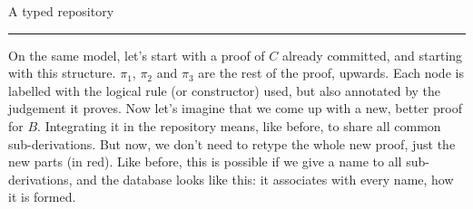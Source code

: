 \documentclass[ignorenonframetext,red]{beamer}
\begin{document}
\begin{frame}{A typed repository}
\end{frame}
\hrule

On the same model, let's start with a proof of $C$ already committed,
and starting with this structure. $\pi_1$, $\pi_2$ and $\pi_3$ are the
rest of the proof, upwards. Each node is labelled with the logical
rule (or constructor) used, but also annotated by the judgement it
proves. Now let's imagine that we come up with a new, better proof for
$B$. Integrating it in the repository means, like before, to share all
common sub-derivations. But now, we don't need to retype the whole new
proof, just the new parts (in red). Like before, this is possible if
we give a name to all sub-derivations, and the database looks like
this: it associates with every name, how it is formed.
\end{document}
